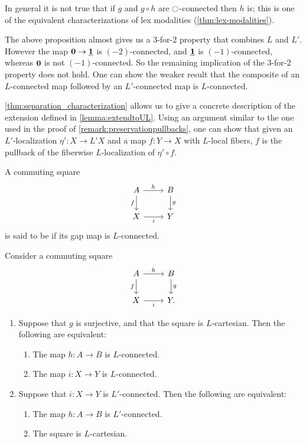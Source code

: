 \begin{rmk}
In general it is not true that if $g$ and $g\circ h$ are ${\ocircle}$-connected then $h$ is; this is one of the equivalent characterizations of lex modalities (\cref{thm:lex-modalities}).

The above proposition almost gives us a 3-for-2 property that combines $L$ and $L'$.
However the map $\mathbf{0} \to \underline{\mathbf{1}}$ is $(-2)$-connected, and $\underline{\mathbf{1}}$ is $(-1)$-connected,
whereas $\mathbf{0}$ is not $(-1)$-connected. So the remaining implication of the 3-for-2 property
does not hold. One can show the weaker result that the composite of an $L$-connected map followed by
an $L'$-connected map is $L$-connected.
\end{rmk}

\begin{rmk}
\cref{thm:separation_characterization} allows us to give a concrete description of
the extension defined in \cref{lemma:extendtoUL}.
Using an argument similar to the one used in the proof of \cref{remark:preservationpullbacks},
one can show that given an $L'$-localization $\eta' : X \to L' X$
and a map $f: Y \to X$ with $L$-local fibers, $f$ is the pullback of
the fiberwise $L$-localization of $\eta' \circ f$.
\end{rmk}

\begin{defn}
A commuting square
\begin{equation*}
\begin{tikzcd}
A\arrow[d,swap,"f"] \arrow[r,"h"] & B \arrow[d,"g"] \\
X \arrow[r,swap,"i"] & Y
\end{tikzcd}
\end{equation*}
is said to be  if its gap map is $L$-connected.
\end{defn}

\begin{prp}
Consider a commuting square
\begin{equation*}
\begin{tikzcd}
A\arrow[d,swap,"f"] \arrow[r,"h"] & B \arrow[d,"g"] \\
X \arrow[r,swap,"i"] & Y.
\end{tikzcd}
\end{equation*}
\begin{enumerate}
\item Suppose that $g$ is surjective, and that the square is $L$-cartesian. Then the following are equivalent:
\begin{enumerate}
\item The map $h:A\to B$ is $L$-connected.
\item The map $i:X\to Y$ is $L$-connected.
\end{enumerate}
\item Suppose that $i:X\to Y$ is $L'$-connected. Then the following are equivalent:
\begin{enumerate}
\item The map $h:A\to B$ is $L'$-connected.
\item The square is $L$-cartesian.
\end{enumerate}
\end{enumerate}
\end{prp}

